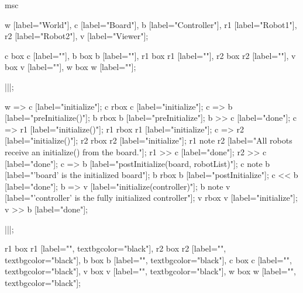 \begin{msc}
msc
{

w [label="World"],
c [label="Board"],
b [label="Controller"],
r1 [label="Robot1"],
r2 [label="Robot2"],
v [label="Viewer"];

c box c [label=""],
b box b [label=""],
r1 box r1 [label=""],
r2 box r2 [label=""],
v box v [label=""],
w box w [label=""];

|||;

w => c [label="initialize"];
c rbox c [label="initialize"];
c => b [label="preInitialize()"];
b rbox b [label="preInitialize"];
b >> c [label="done"];
c => r1 [label="initialize()"];
r1 rbox r1 [label="initialize"];
c => r2 [label="initialize()"];
r2 rbox r2 [label="initialize"];
r1 note r2 [label="All robots receive an initialize() from the board."];
r1 >> c [label="done"];
r2 >> c [label="done"];
c => b [label="postInitialize(board, robotList)"];
c note b [label="'board' is the initialized board"];
b rbox b [label="postInitialize"];
c << b [label="done"];
b => v [label="initialize(controller)"];
b note v [label="'controller' is the fully initialized controller"];
v rbox v [label="initialize"];
v >> b [label="done"];

|||;

r1 box r1 [label="", textbgcolor="black"],
r2 box r2 [label="", textbgcolor="black"],
b box b [label="", textbgcolor="black"],
c box c [label="", textbgcolor="black"],
v box v [label="", textbgcolor="black"],
w box w [label="", textbgcolor="black"];

}
\end{msc}
